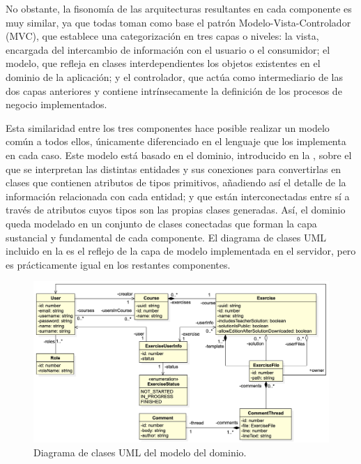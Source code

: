 No obstante, la fisonomía de las arquitecturas resultantes en cada componente es muy similar, ya que todas toman como base el patrón Modelo-Vista-Controlador \cite{Arq_MVCFowler} (MVC), que establece una categorización en tres capas o niveles: la vista, encargada del intercambio de información con el usuario o el consumidor; el modelo, que refleja en clases interdependientes los objetos existentes en el dominio de la aplicación; y el controlador, que actúa como intermediario de las dos capas anteriores y contiene intrínsecamente la definición de los procesos de negocio implementados.

Esta similaridad entre los tres componentes hace posible realizar un modelo común a todos ellos, únicamente diferenciado en el lenguaje que los implementa en cada caso. Este modelo está basado en el dominio, introducido en la , sobre el que se interpretan las distintas entidades y sus conexiones para convertirlas en clases que contienen atributos de tipos primitivos, añadiendo así el detalle de la información relacionada con cada entidad; y que están interconectadas entre sí a través de atributos cuyos tipos son las propias clases generadas. Así, el dominio queda modelado en un conjunto de clases conectadas que forman la capa sustancial y fundamental de cada componente. El diagrama de clases UML incluido en la  es el reflejo de la capa de modelo implementada en el servidor, pero es prácticamente igual en los restantes componentes.

\begin{figure}[ht]
    \centering
    \includegraphics[width=\textwidth]{imagenes/utilizadas/4-2-arquitectura/diagramas/diag2-modeloDominioServidor.png}
    \caption{Diagrama de clases UML del modelo del dominio.}
    \label{fig:diagClasesModelo}
\end{figure}

